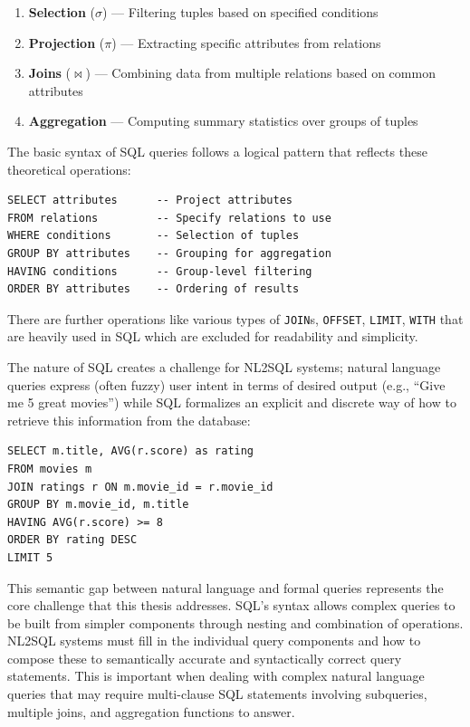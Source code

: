 \begin{enumerate}
    \item \textbf{Selection} ($\sigma$) — Filtering tuples based on specified
        conditions
    \item \textbf{Projection} ($\pi$) — Extracting specific attributes from
        relations
    \item \textbf{Joins} ($\bowtie$) — Combining data from multiple relations
        based on common attributes
    \item \textbf{Aggregation} — Computing summary statistics over groups of
        tuples
\end{enumerate}

The basic syntax of SQL queries follows a logical pattern that reflects these
theoretical operations:

\begin{verbatim}
SELECT attributes      -- Project attributes
FROM relations         -- Specify relations to use
WHERE conditions       -- Selection of tuples
GROUP BY attributes    -- Grouping for aggregation
HAVING conditions      -- Group-level filtering
ORDER BY attributes    -- Ordering of results
\end{verbatim}

There are further operations like various types of \texttt{JOIN}s,
\texttt{OFFSET}, \texttt{LIMIT}, \texttt{WITH} that are heavily used in SQL
which are excluded for readability and simplicity.

The nature of SQL creates a challenge for NL2SQL systems; natural language
queries express (often fuzzy) user intent in terms of desired output (e.g.,
``Give me 5 great movies'') while SQL formalizes an explicit and discrete way
of how to retrieve this information from the database:

\begin{verbatim}
SELECT m.title, AVG(r.score) as rating
FROM movies m
JOIN ratings r ON m.movie_id = r.movie_id
GROUP BY m.movie_id, m.title
HAVING AVG(r.score) >= 8
ORDER BY rating DESC
LIMIT 5
\end{verbatim}

This semantic gap between natural language and formal queries represents the
core challenge that this thesis addresses. SQL's syntax allows complex
queries to be built from simpler components through nesting and combination of
operations. NL2SQL systems must fill in the individual query components and how
to compose these to semantically accurate and syntactically correct query
statements. This is important when dealing with complex natural language
queries that may require multi-clause SQL statements involving subqueries,
multiple joins, and aggregation functions to answer.

